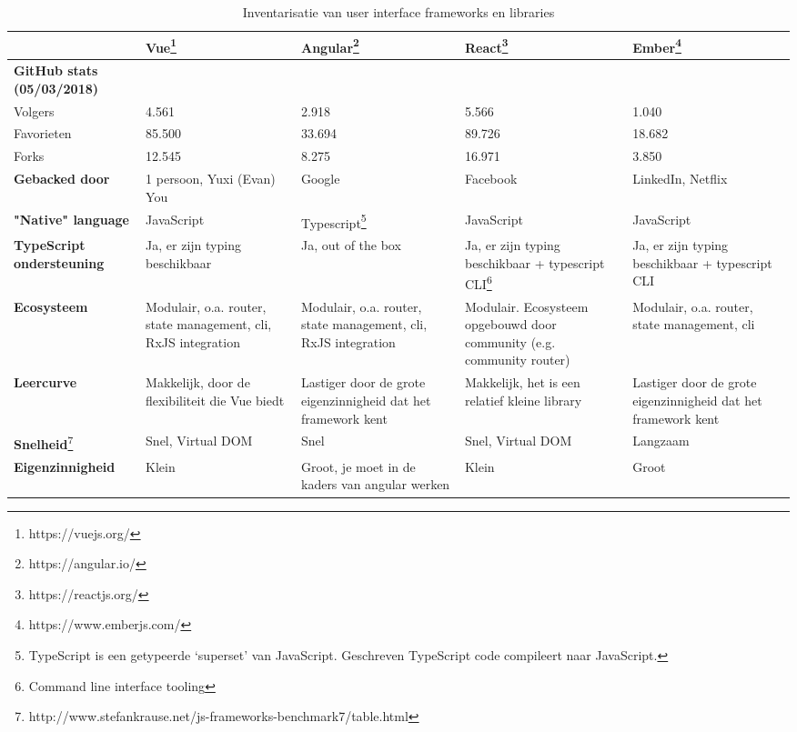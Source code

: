 \begin{table}[htb]
    \centering
    \begin{tabular}{ l | p{2.5cm} p{2.5cm} p{2.5cm} p{2.5cm} }
    & \textbf{Vue}\footnote{https://vuejs.org/} & \textbf{Angular}\footnote{https://angular.io/} & \textbf{React}\footnote{https://reactjs.org/} & \textbf{Ember}\footnote{https://www.emberjs.com/}\\
    \hline
    \textbf{GitHub stats (05/03/2018)} & & &\\
    Volgers & 4.561 & 2.918 & 5.566 & 1.040\\
    Favorieten & 85.500 & 33.694 & 89.726 & 18.682\\
    Forks & 12.545 & 8.275 & 16.971 & 3.850\\
    \textbf{Gebacked door} & 1 persoon, Yuxi (Evan) You &Google & Facebook & LinkedIn, Netflix\\
    \textbf{"Native" language} & JavaScript & Typescript\footnote{TypeScript is een getypeerde ‘superset’ van JavaScript. Geschreven TypeScript code compileert naar JavaScript.} & JavaScript & JavaScript\\
    \textbf{TypeScript ondersteuning} & Ja, er zijn typing beschikbaar &Ja, out of the box & Ja, er zijn typing beschikbaar + typescript CLI\footnote{Command line interface tooling} & Ja, er zijn typing beschikbaar + typescript CLI\\
    \textbf{Ecosysteem} & Modulair, o.a. router, state management, cli, RxJS integration & Modulair, o.a. router, state management, cli, RxJS integration &	Modulair. Ecosysteem opgebouwd door community (e.g. community router) & Modulair, o.a. router, state management, cli\\
    \textbf{Leercurve} & \cellcolor{green!15}Makkelijk, door de flexibiliteit die Vue biedt & \cellcolor{red!25}Lastiger door de grote eigenzinnigheid dat het framework kent & \cellcolor{green!15}Makkelijk, het is een relatief kleine library & \cellcolor{red!25}Lastiger door de grote eigenzinnigheid dat het framework kent\\
    \textbf{Snelheid}\footnote{http://www.stefankrause.net/js-frameworks-benchmark7/table.html} & \cellcolor{green!15}Snel, Virtual DOM & \cellcolor{green!15}Snel & \cellcolor{green!15}Snel, Virtual DOM & \cellcolor{red!25}Langzaam\\
    \textbf{Eigenzinnigheid} & \cellcolor{green!15}Klein & \cellcolor{red!25}Groot, je moet in de kaders van angular werken & \cellcolor{green!15}Klein & \cellcolor{red!25}Groot\\
    \end{tabular}
    \caption{Inventarisatie van user interface frameworks en libraries}
    \label{tab:uiframeworks}
\end{table}

